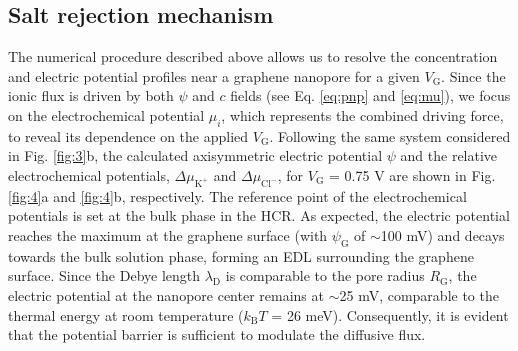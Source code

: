 \documentclass[journal=langd5,email=true, hyperref=true, keywords=false]{achemso}
\newcommand{\Fig}{Fig.}
\begin{document}
\subsection{Salt rejection mechanism}
\label{sec:mechanism}

The numerical procedure described above allows us to resolve the
concentration and electric potential profiles near a graphene
nanopore for a given $V_{\mathrm{G}}$. Since the ionic flux is driven
by both $\psi$ and $c$ fields (see Eq. \eqref{eq:pnp} and \eqref{eq:mu}),
we focus on the electrochemical potential $\mu_{i}$, which represents
the combined driving force, to reveal its dependence on the applied
$V_{\mathrm{G}}$. Following the same system considered in \Fig{}
\ref{fig:3}b, the calculated axisymmetric electric potential $\psi$
and the relative electrochemical potentials,
$\Delta \mu_{\mathrm{K^{+}}}$ and $\Delta \mu_{\mathrm{Cl^{-}}}$, for
$V_{\mathrm{G}}$ = 0.75 V are shown in \Fig{} \ref{fig:4}a and
\ref{fig:4}b, respectively. The reference point of the electrochemical
potentials is set at the bulk phase in the HCR. As expected, the
electric potential reaches the maximum at the graphene surface (with
$\psi_{\mathrm{G}}$ of $\sim$100 mV) and decays towards the bulk
solution phase, forming an EDL surrounding the graphene surface. Since
the Debye length $\lambda_{\mathrm{D}}$ is comparable to the
pore radius $R_{\mathrm{G}}$, the electric potential at the nanopore
center remains at $\sim$25 mV, comparable to the thermal energy at
room temperature ($k_{\mathrm{B}}T$ = 26 meV). Consequently, it is
evident that the potential barrier is sufficient to modulate the
diffusive flux.
\end{document}
